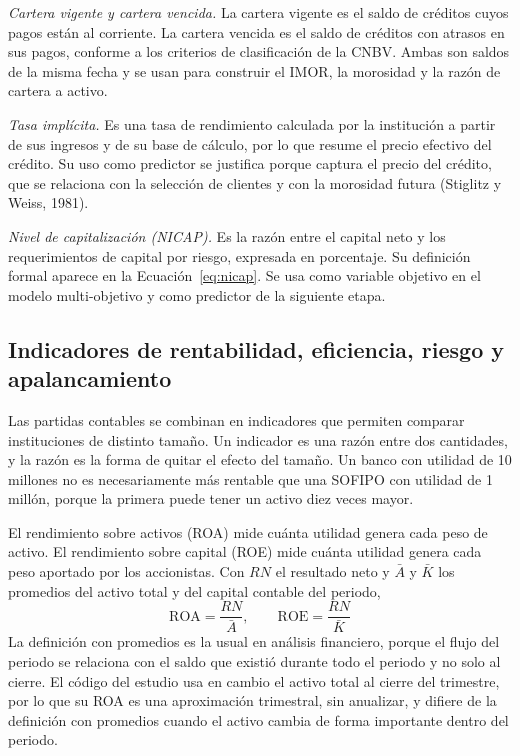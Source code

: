 \textit{Cartera vigente y cartera vencida.} La cartera vigente es el saldo de créditos cuyos pagos están al corriente. La cartera vencida es el saldo de créditos con atrasos en sus pagos, conforme a los criterios de clasificación de la CNBV. Ambas son saldos de la misma fecha y se usan para construir el IMOR, la morosidad y la razón de cartera a activo.

\textit{Tasa implícita.} Es una tasa de rendimiento calculada por la institución a partir de sus ingresos y de su base de cálculo, por lo que resume el precio efectivo del crédito. Su uso como predictor se justifica porque captura el precio del crédito, que se relaciona con la selección de clientes y con la morosidad futura (Stiglitz y Weiss, 1981). %

\textit{Nivel de capitalización (NICAP).} Es la razón entre el capital neto y los requerimientos de capital por riesgo, expresada en porcentaje. Su definición formal aparece en la Ecuación~\eqref{eq:nicap}. Se usa como variable objetivo en el modelo multi-objetivo y como predictor de la siguiente etapa.
\subsection{Indicadores de rentabilidad, eficiencia, riesgo y apalancamiento}
Las partidas contables se combinan en indicadores que permiten comparar instituciones de distinto tamaño. Un indicador es una razón entre dos cantidades, y la razón es la forma de quitar el efecto del tamaño. Un banco con utilidad de 10 millones no es necesariamente más rentable que una SOFIPO con utilidad de 1 millón, porque la primera puede tener un activo diez veces mayor.

El rendimiento sobre activos (ROA) mide cuánta utilidad genera cada peso de activo. El rendimiento sobre capital (ROE) mide cuánta utilidad genera cada peso aportado por los accionistas. Con $RN$ el resultado neto y $\bar{A}$ y $\bar{K}$ los promedios del activo total y del capital contable del periodo,
\begin{equation}
\text{ROA}=\frac{RN}{\bar{A}}, \qquad \text{ROE}=\frac{RN}{\bar{K}}
\label{eq:roa}
\end{equation}
La definición con promedios es la usual en análisis financiero, porque el flujo del periodo se relaciona con el saldo que existió durante todo el periodo y no solo al cierre. El código del estudio usa en cambio el activo total al cierre del trimestre, por lo que su ROA es una aproximación trimestral, sin anualizar, y difiere de la definición con promedios cuando el activo cambia de forma importante dentro del periodo. %

